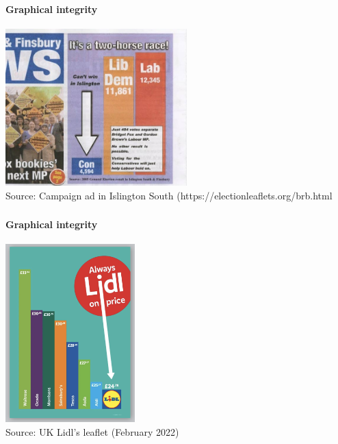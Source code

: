 \documentclass[8pt]{beamer}
\begin{document}

\begin{frame}
\frametitle{\insertsection}
\framesubtitle{Graphical integrity}

\centering
\includegraphics[width=7cm]{lib_dem.jpg}\\
\tiny{Source: Campaign ad in Islington South (https://electionleaflets.org/brb.html}

\end{frame}


\begin{frame}
\frametitle{\insertsection}
\framesubtitle{Graphical integrity}

\centering
\includegraphics[width=5cm]{lidl_feb2022}\\
\tiny{Source: UK Lidl's leaflet (February 2022)}

\end{frame}

\end{document}
